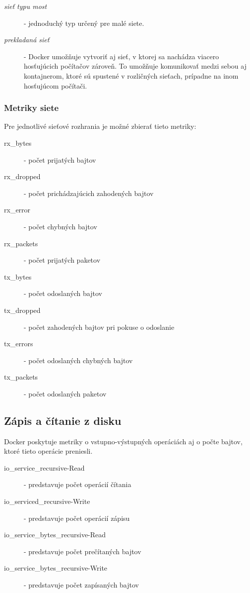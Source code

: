 \documentclass[12pt,twoside,color,cover,table]{fithesis3}
\begin{document}
\begin{description}
\item[\emph{sieť typu most}] - jednoduchý typ určený pre malé siete.
\item[\emph{prekladaná sieť}] - Docker umožňuje vytvoriť aj sieť, v ktorej sa nachádza viacero hosťujúcich počítačov zároveň. To umožňuje 
komunikovať medzi sebou aj kontajnerom, ktoré sú spustené v rozličných sieťach, prípadne na inom hosťujúcom počítači.
\end{description}

\subsubsection{Metriky siete}
Pre jednotlivé sieťové rozhrania je možné zbierať tieto metriky:
\begin{description}
\item[rx\_bytes] - počet prijatých bajtov
\item[rx\_dropped] - počet prichádzajúcich zahodených bajtov
\item[rx\_error] - počet chybných bajtov
\item[rx\_packets] - počet prijatých paketov
\item[tx\_bytes] - počet odoslaných bajtov
\item[tx\_dropped] - počet zahodených bajtov pri pokuse o odoslanie
\item[tx\_errors] - počet odoslaných chybných bajtov
\item[tx\_packets] - počet odoslaných paketov
\end{description}

\subsection{Zápis a čítanie z disku}
Docker poskytuje metriky o vstupno-výstupných operáciách aj o počte bajtov, ktoré tieto operácie preniesli.
\begin{description}
\item[io\_service\_recursive-Read] - predstavuje počet operácií čítania
\item[io\_serviced\_recursive-Write] - predstavuje počet operácií zápisu
\item[io\_service\_bytes\_recursive-Read] - predstavuje počet prečítaných bajtov
\item[io\_service\_bytes\_recursive-Write] - predstavuje počet zapísaných bajtov
\end{description}
\end{document}

